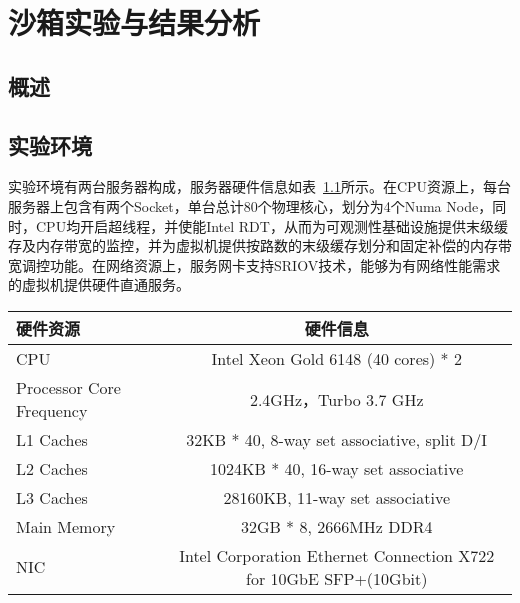 \chapter{沙箱实验与结果分析}\label{chap:exp}

% 

\section{概述}

\section{实验环境}

实验环境有两台服务器构成，服务器硬件信息如表~\ref{tab:exp_env}所示。在CPU资源上，每台服务器上包含有两个Socket，单台总计80个物理核心，划分为4个Numa Node，同时，CPU均开启超线程，并使能Intel RDT，从而为可观测性基础设施提供末级缓存及内存带宽的监控，并为虚拟机提供按路数的末级缓存划分和固定补偿的内存带宽调控功能。在网络资源上，服务网卡支持SRIOV技术，能够为有网络性能需求的虚拟机提供硬件直通服务。

\begin{table}
    \label{tab:exp_env}
    \footnotesize%
    \setlength{\tabcolsep}{4pt}%
    \renewcommand{\arraystretch}{1.5}%
    \centering
    \begin{tabular}{lc}
        \hline
        硬件资源 & 硬件信息 \\
        \hline
        CPU & Intel Xeon Gold 6148 (40 cores) * 2 \\
        Processor Core Frequency & 2.4GHz，Turbo 3.7 GHz \\
        L1 Caches & 32KB * 40,  8-way set associative, split D/I \\
        L2 Caches & 1024KB * 40, 16-way set associative \\
        L3 Caches & 28160KB, 11-way set associative \\
        Main Memory & 32GB * 8, 2666MHz DDR4 \\
        NIC & Intel Corporation Ethernet Connection X722 for 10GbE SFP+(10Gbit) \\
        \hline
    \end{tabular}
\end{table}

